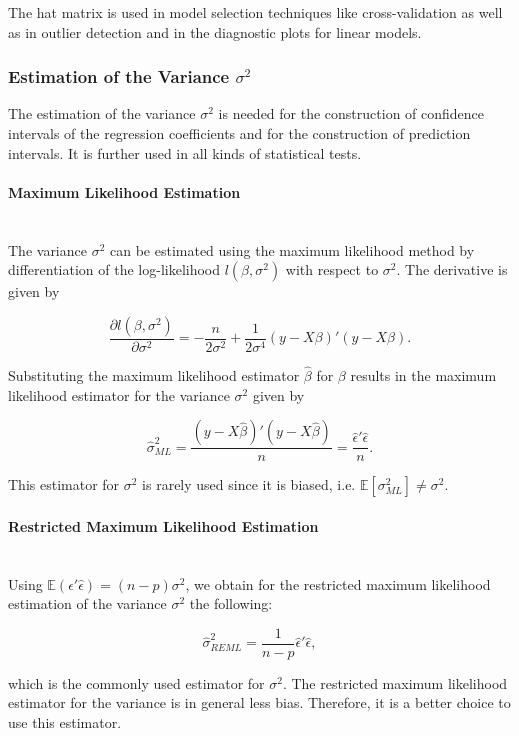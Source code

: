 \documentclass[10pt,a4paper]{article}
\newcommand{\subsubsubsection}[1]{\paragraph{#1}\mbox{}\\}
\begin{document}
The hat matrix is used in model selection techniques like cross-validation as well as in outlier detection and in the diagnostic plots for linear models.

\subsubsection{Estimation of the Variance $\sigma^2$}

The estimation of the variance $\sigma^2$ is needed for the construction of confidence intervals of the regression coefficients and for the construction of prediction intervals. It is further used in all kinds of statistical tests. 

\subsubsubsection{Maximum Likelihood Estimation}

The variance $\sigma^2$ can be estimated using the maximum likelihood method by differentiation of the log-likelihood $l(\beta, \sigma^2)$ with respect to $\sigma^2$. The derivative is given by

$$\frac{\partial l(\beta, \sigma^2)}{\partial \sigma^2} = -\frac{n}{2\sigma^2} + \frac{1}{2\sigma^4}(y - X\beta)'(y - X\beta).  $$

Substituting the maximum likelihood estimator $\hat \beta$ for $\beta$ results in the maximum likelihood estimator for the variance $\sigma^2$ given by

\begin{equation} \label{sigma_ML}
	\hat \sigma_{ML}^2 = \frac{(y-X\hat\beta)'(y - X\hat\beta)}{n} = \frac{\hat\epsilon' \hat\epsilon}{n}.
\end{equation}

This estimator for $\sigma^2$ is rarely used since it is biased, i.e. $\mathbb{E}[\sigma^2_{ML}] \ne \sigma^2$. 

\subsubsubsection{Restricted Maximum Likelihood Estimation}

Using $\mathbb{E}(\hat\epsilon' \hat\epsilon) = (n - p)\sigma^2$, we obtain for the restricted maximum likelihood estimation of the variance $\sigma^2$ the following:

\begin{equation} \label{sigma_REML}
	\hat \sigma^2_{REML} = \frac{1}{n-p} \hat\epsilon' \hat\epsilon,
\end{equation}

which is the commonly used estimator for $\sigma^2$. The restricted maximum likelihood estimator for the variance is in general less bias. Therefore, it is a better choice to use this estimator.
\end{document}
